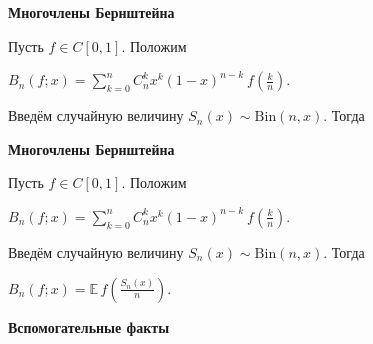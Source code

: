 \documentclass[11pt]{article}
\begin{document}
\newpage

\begin{center}
{\color{notaeYELLOW}\bfseries\fontsize{44}{52}\selectfont Многочлены Бернштейна}
\end{center}
\vspace*{\fill}
\begin{center}
\fontsize{36}{43}\selectfont
Пусть $f \in C[0,1]$. Положим\par\vspace{0.4in}
$B_n(f;x) = \sum\limits_{k=0}^{n}  C_n^k x^k (1-x)^{n-k}\ f\!\left(\frac{k}{n}\right).$\par\vspace{0.4in}
Введём случайную величину $S_n(x) \sim \mathrm{Bin}(n,x)$. Тогда\par\vspace{0.4in}
\end{center}
\vspace*{\fill}

\newpage

\begin{center}
{\color{notaeYELLOW}\bfseries\fontsize{44}{52}\selectfont Многочлены Бернштейна}
\end{center}
\vspace*{\fill}
\begin{center}
\fontsize{36}{43}\selectfont
Пусть $f \in C[0,1]$. Положим\par\vspace{0.4in}
$B_n(f;x) = \sum\limits_{k=0}^{n}  C_n^k x^k (1-x)^{n-k}\ f\!\left(\frac{k}{n}\right).$\par\vspace{0.4in}
Введём случайную величину $S_n(x) \sim \mathrm{Bin}(n,x)$. Тогда\par\vspace{0.4in}
$B_n(f;x) = \mathbb{E}\, f\!\left(\frac{S_n(x)}{n}\right).$\par\vspace{0.4in}
\end{center}
\vspace*{\fill}

\newpage

\begin{center}
{\color{notaeYELLOW}\bfseries\fontsize{44}{52}\selectfont Вспомогательные факты}
\end{center}
\vspace*{\fill}
\begin{center}
\fontsize{36}{43}\selectfont
\end{center}
\vspace*{\fill}
\end{document}
